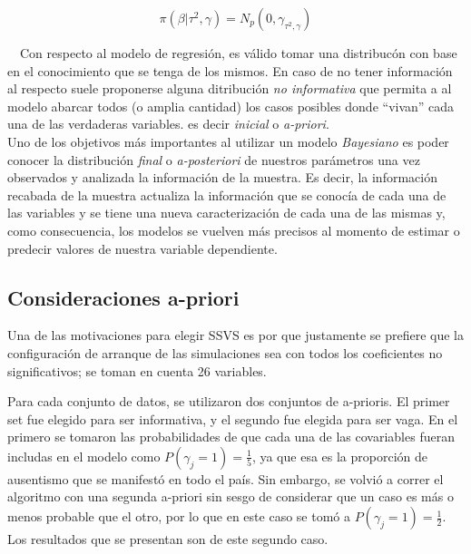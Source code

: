\documentclass[DIV=calc, 
					paper=letter, 
					fontsize=11pt, 
					twocolumn]{scrartcl}
\begin{document}
\begin{equation}
\pi(\beta | \tau ^{2}, \gamma) = N_p (0, \gamma_{\tau ^{2},\gamma})
\end{equation}

~~Con respecto al modelo de regresi\'on, es v\'alido tomar una distribuc\'on con base en el conocimiento que se tenga de los mismos. En caso de no tener informaci\'on al respecto suele proponerse alguna ditribuci\'on \textit{no informativa} que permita a al modelo abarcar todos (o amplia cantidad) los casos posibles donde ``vivan''  cada una de las verdaderas variables. es decir \textit{inicial} o \textit{a-priori}. \\

Uno de los objetivos m\'as importantes al utilizar un modelo \textit{Bayesiano} es poder conocer la distribuci\'on \textit{final} o \textit{a-posteriori} de nuestros par\'ametros una vez observados y analizada la informaci\'on de la muestra. Es decir, la informaci\'on recabada de la muestra actualiza la informaci\'on que se conoc\'ia de cada una de las variables y se tiene una nueva caracterizaci\'on de cada una de las mismas y, como consecuencia, los modelos se vuelven m\'as precisos al momento de estimar o predecir valores de nuestra variable dependiente.\\

\subsection{Consideraciones a-priori}
\vspace{3mm}

Una de las motivaciones para elegir SSVS es por que justamente se prefiere que la configuraci\'on de arranque de las simulaciones sea con todos los coeficientes no significativos; se toman en cuenta 26 variables.

Para cada conjunto de datos, se utilizaron dos conjuntos de a-prioris. El primer set fue elegido para ser informativa, y el segundo fue elegida para ser vaga. En el primero se tomaron las probabilidades de que cada una de las covariables fueran includas en el modelo como $P(\gamma_j=1)=\frac{1}{5}$, ya que esa es la proporci\'on de ausentismo que se manifest\'o en todo el pa\'is. Sin embargo, se volvi\'o a correr el algoritmo con una segunda a-priori sin sesgo de considerar que un caso es más o menos probable que el otro, por lo que en este caso se tom\'o a $P(\gamma_j=1)=\frac{1}{2}$. Los resultados que se presentan son de este segundo caso.\\
\end{document}
